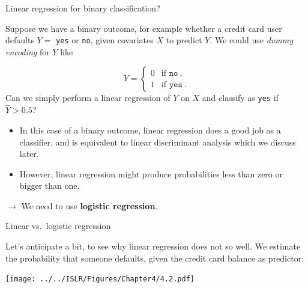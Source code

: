 \documentclass[
  10pt,
  ignorenonframetext,
]{beamer}
\providecommand{\tightlist}{%
  \setlength{\itemsep}{0pt}\setlength{\parskip}{0pt}}
\begin{document}
\begin{frame}[fragile]
\begin{block}{Linear regression for binary classification?}
\protect\hypertarget{linear-regression-for-binary-classification}{}
\vspace{1mm}

Suppose we have a binary outcome, for example whether a credit card user
defaults \(Y =\) \texttt{yes} or \texttt{no}, given covariates \(X\) to
predict \(Y\). We could use \emph{dummy encoding} for \(Y\) like

\[Y = \left\{ \begin{array}{ll}
0 & \text{if } \texttt{no} \ , \\
1 & \text{if } \texttt{yes} \ .
\end{array} \right.\] Can we simply perform a linear regression of \(Y\)
on \(X\) and classify as \texttt{yes} if \(\hat{Y}> 0.5\)?

\vspace{2mm}

\begin{itemize}
\tightlist
\item
  In this case of a binary outcome, linear regression does a good job as
  a classifier, and is equivalent to linear discriminant analysis which
  we discuss later.
\end{itemize}

\vspace{2mm}

\begin{itemize}
\tightlist
\item
  However, linear regression might produce probabilities less than zero
  or bigger than one.
\end{itemize}

\vspace{2mm}

\(\rightarrow\) We need to use \textbf{logistic regression}.
\end{block}
\end{frame}

\begin{frame}
\begin{block}{Linear vs.~logistic regression}
\protect\hypertarget{linear-vs.-logistic-regression}{}
\(~\)

Let's anticipate a bit, to see why linear regression does not so well.
We estimate the probability that someone defaults, given the credit card
balance as predictor: \vspace{2mm}

\texttt{[image: ../../ISLR/Figures/Chapter4/4.2.pdf]}
\end{block}
\end{frame}
\end{document}
